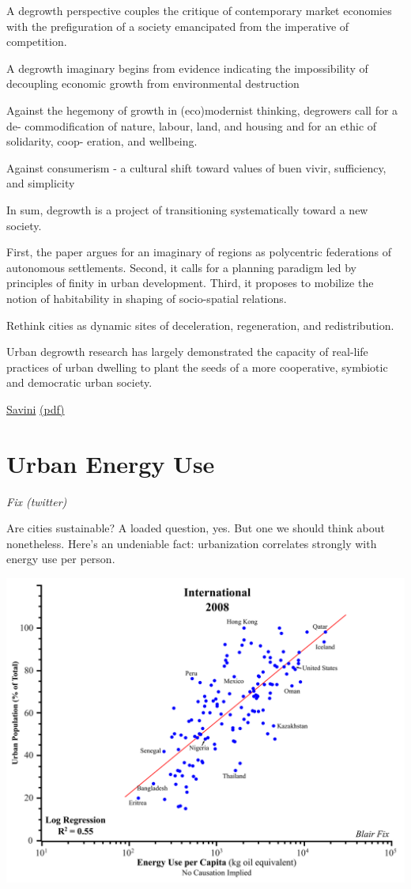 \documentclass[
]{book}
\begin{document}
A degrowth perspective couples the critique of contemporary
market economies with the prefiguration of a society
emancipated from the imperative of competition.

A degrowth imaginary begins from evidence indicating
the impossibility of decoupling
economic growth from environmental destruction

Against the hegemony of growth in (eco)modernist thinking, degrowers call for a de-
commodification of nature, labour, land, and housing and for an ethic of solidarity, coop-
eration, and wellbeing.

Against consumerism - a
cultural shift toward values of buen vivir, sufficiency, and simplicity

In sum, degrowth is a project of transitioning systematically
toward a new society.

First, the paper argues for an imaginary of regions as polycentric federations of
autonomous settlements. Second, it calls for a planning paradigm led by principles of finity
in urban development. Third, it proposes to mobilize the notion of habitability in shaping of
socio-spatial relations.

Rethink cities as dynamic sites of deceleration, regeneration, and redistribution.

Urban degrowth research has largely demonstrated the capacity of real-life
practices of urban dwelling to plant the seeds of a more
cooperative, symbiotic and democratic urban society.

\href{https://journals.sagepub.com/doi/10.1177/0308518X20981391}{Savini}
\href{/pdf/Savini_2020_Urban_Degrowth.pdf}{(pdf)}

\hypertarget{urban-energy-use}{%
\section{Urban Energy Use}\label{urban-energy-use}}

\emph{Fix (twitter)}

Are cities sustainable? A loaded question, yes. But one we should think about nonetheless.
Here's an undeniable fact: urbanization correlates strongly with energy use per person.

\includegraphics{fig/Fix_2008_Urban_Energy_Use.png}
\end{document}
